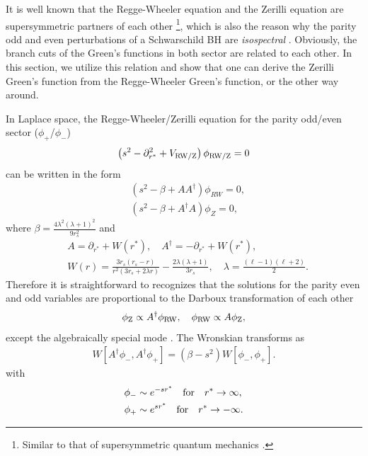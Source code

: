 \label{sec:darboux_transform}
It is well known that the Regge-Wheeler equation and the Zerilli equation are supersymmetric partners of each other \footnote{Similar to that of supersymmetric quantum mechanics \cite{Cooper:1994eh}.}, which is also the reason why the parity odd and even perturbations of a Schwarschild BH are {\it isospectral} \cite{Chandrasekhar:1975zza}. Obviously, the branch cuts of the Green's functions in both sector are related to each other. In this section, we utilize this relation and show that one can derive the Zerilli Green's function from the Regge-Wheeler Green's function, or the other way around. 

In Laplace space, the Regge-Wheeler/Zerilli equation for the parity odd/even sector ($\phi_+$/$\phi_-$) 
\begin{align} \label{eqn:laplRWZeqn}
   \left( s^2 -\partial_{r^*}^2 + V_{\rm RW/Z}\right)\phi_{\rm RW/Z} =0
\end{align}
can be written in the form 
\begin{align}
   &\left( s^2 - \beta + A A^\dagger \right) \phi_{RW} =0, \nonumber \\
   & \left( s^2 - \beta + A^\dagger A \right) \phi_{Z} =0,
\end{align}
where $\beta = \frac{4\lambda^2(\lambda+1)^2}{9r_s^2}$ and 
\begin{align}
   & A = \partial_{r^*}+W(r^*), \quad  A^\dagger = -\partial_{r^*}+W(r^*), \nonumber \\
   & W(r) = \frac{3 r_s(r_s-r) }{r^2 (3r_s + 2\lambda r)} - \frac{2\lambda(\lambda+1)}{3r_s} , \quad \lambda= \frac{(\ell -1)(\ell+2)}{2}.
\end{align}
Therefore it is straightforward to recognizes that the solutions for the parity even and odd variables are proportional to the Darboux transformation of each other 
\begin{align} \label{eqn:susytrans}
    \phi_{\rm Z} \propto A^\dagger \phi_{\rm RW}, \quad \phi_{\rm RW} \propto A \phi_{\rm Z} ,
\end{align}
except the algebraically special mode \cite{Chandrasekhar:1984mgh}. The Wronskian transforms as 
\begin{align}
    W[A^\dagger \phi_-, A^\dagger \phi_+] = (\beta -s^2)W[\phi_-,  \phi_+] .
\end{align}
with 
\begin{align}
    \phi_- & \sim e^{-sr^*}  \quad   {\rm for } \quad  r^* \to \infty , \nonumber \\
    \phi_+ &\sim e^{sr^*}  \quad   {\rm for } \quad  r^* \to -\infty .
\end{align}
